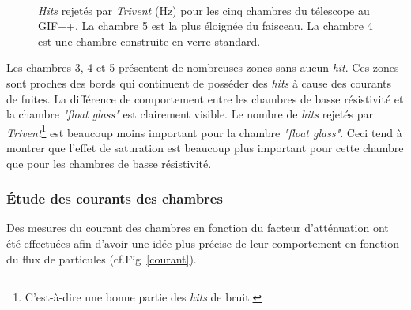 \begin{figure}[ht!]
	\\
	\vspace{0.7cm}
	\caption{\textit{Hits} rejetés par \textit{Trivent} (\si{\hertz}) pour les cinq chambres du télescope au GIF++. La chambre \num{5} est la plus éloignée du faisceau. La chambre \num{4} est une chambre construite en verre standard.}
	\label{struc}
\end{figure}

Les chambres \num{3}, \num{4} et \num{5} présentent de nombreuses zones sans aucun \textit{hit}. Ces zones sont proches des bords qui continuent de posséder des \textit{hits} à cause des courants de fuites. La différence de comportement entre les chambres de basse résistivité et la chambre \textit{"float glass"} est clairement visible. Le nombre de \textit{hits} rejetés par \textit{Trivent}\footnote{C'est-à-dire une bonne partie des \textit{hits} de bruit.} est beaucoup moins important pour la chambre \textit{"float glass"}. Ceci tend à montrer que l'effet de saturation est beaucoup plus important pour cette chambre que pour les chambres de basse résistivité.

\subsubsection{Étude des courants des chambres}
Des mesures du courant des chambres en fonction du facteur d'atténuation ont été effectuées afin d'avoir une idée plus précise de leur comportement en fonction du flux de particules (cf.Fig~\ref{courant}).

